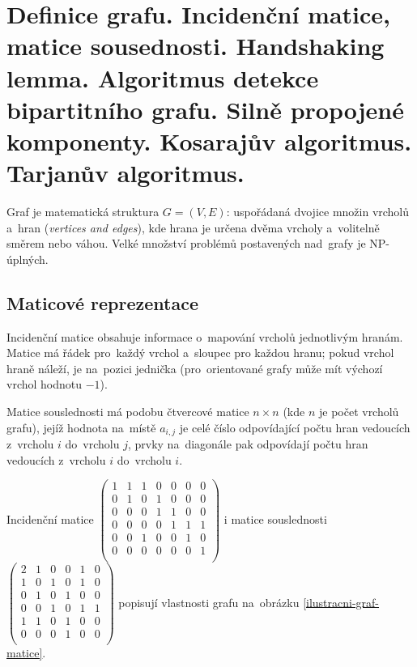 \clearpage
\section{Definice grafu. Incidenční matice, matice sousednosti. Handshaking lemma. Algoritmus detekce bipartitního grafu. Silně propojené komponenty. Kosarajův algoritmus. Tarjanův algoritmus.}

Graf je matematická struktura $G = (V, E)$: uspořádaná dvojice množin vrcholů a~hran (\emph{vertices and edges}), kde hrana je určena dvěma vrcholy a~volitelně směrem nebo váhou.
Velké množství problémů postavených nad~grafy je NP-úplných.

\subsection{Maticové reprezentace}

Incidenční matice obsahuje informace o~mapování vrcholů jednotlivým hranám.
Matice má řádek pro~každý vrchol a~sloupec pro každou hranu; pokud vrchol hraně náleží, je na~pozici jednička (pro~orientované grafy může mít výchozí vrchol hodnotu $-1$).

Matice souslednosti má podobu čtvercové matice $n \times n$ (kde $n$ je počet vrcholů grafu), jejíž hodnota na~místě $a_{i,j}$ je celé číslo odpovídající počtu hran vedoucích z~vrcholu $i$ do~vrcholu $j$, prvky na~diagonále pak odpovídají počtu hran vedoucích z~vrcholu $i$ do~vrcholu $i$.

Incidenční matice
$\left( \begin{matrix}
1 & 1 & 1 & 0 & 0 & 0 & 0 \\
0 & 1 & 0 & 1 & 0 & 0 & 0 \\
0 & 0 & 0 & 1 & 1 & 0 & 0 \\
0 & 0 & 0 & 0 & 1 & 1 & 1 \\
0 & 0 & 1 & 0 & 0 & 1 & 0 \\
0 & 0 & 0 & 0 & 0 & 0 & 1 \\
\end{matrix} \right)$ 
i matice souslednosti
$\left( \begin{matrix}
2 & 1 & 0 & 0 & 1 & 0 \\
1 & 0 & 1 & 0 & 1 & 0 \\
0 & 1 & 0 & 1 & 0 & 0 \\
0 & 0 & 1 & 0 & 1 & 1 \\
1 & 1 & 0 & 1 & 0 & 0 \\
0 & 0 & 0 & 1 & 0 & 0 \\
\end{matrix} \right)$
popisují vlastnosti grafu na~obrázku \ref{ilustracni-graf-matice}.

